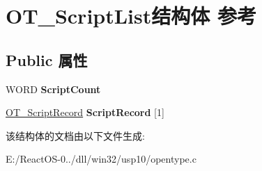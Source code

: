\hypertarget{struct_o_t___script_list}{}\section{O\+T\+\_\+\+Script\+List结构体 参考}
\label{struct_o_t___script_list}
\subsection*{Public 属性}
\begin{DoxyCompactItemize}
\item 
\mbox{\label{struct_o_t___script_list_a3ebf2e858e48a78b74bd2c9045cf9f43}} 
W\+O\+RD {\bfseries Script\+Count}
\item 
\mbox{\label{struct_o_t___script_list_a22622b0c3ad3b3ac27c6447fac0d3ab2}} 
\hyperlink{struct_o_t___script_record}{O\+T\+\_\+\+Script\+Record} {\bfseries Script\+Record} \mbox{[}1\mbox{]}
\end{DoxyCompactItemize}


该结构体的文档由以下文件生成\+:\begin{DoxyCompactItemize}
\item 
E\+:/\+React\+O\+S-\/0../dll/win32/usp10/opentype.\+c\end{DoxyCompactItemize}
